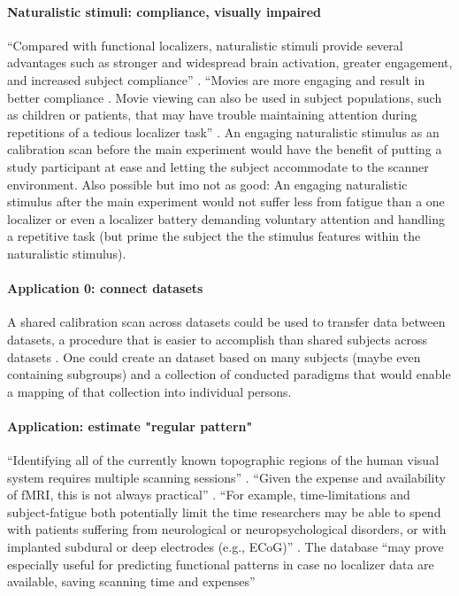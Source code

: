 \paragraph{Naturalistic stimuli: compliance, visually impaired}
%
``Compared with functional localizers, naturalistic stimuli provide several
advantages such as stronger and widespread brain activation, greater engagement,
and increased subject compliance'' \citep{jiahui2020predicting}.
%
``Movies are more engaging and result in better compliance
\citep{vanderwal2015inscapes}.
%
Movie viewing can also be used in subject populations, such as children
\citep{richardson2018development} or patients, that may have trouble maintaining
attention during repetitions of a tedious localizer task''
\citep{jiahui2020predicting}.
%
An engaging naturalistic stimulus as an calibration scan before the main
experiment would have the benefit of putting a study participant at ease and
letting the subject accommodate to the scanner environment.
%
Also possible but imo not as good: An engaging naturalistic stimulus after the
main experiment would not suffer less from fatigue than a one localizer or even
a localizer battery demanding voluntary attention and handling a repetitive task
(but prime the subject the the stimulus features within the naturalistic
stimulus).


\paragraph{Application 0: connect datasets}

%
A shared calibration scan across datasets could be used to transfer data between
datasets, a procedure that is easier to accomplish than shared subjects across
datasets \citep[cf.][an extension of the \ac{srm} for shared subjects across
datasets]{zhang2018transfer}.
%
One could create an dataset based on many subjects (maybe even containing
subgroups) and a collection of conducted paradigms that would enable a mapping
of that collection into individual persons.


\paragraph{Application: estimate "regular pattern"}

``Identifying all of the currently known topographic regions of the human visual
system requires multiple scanning sessions'' \citep{wang2015probabilistic}.
%
``Given the expense and availability of fMRI, this is not always practical''
\citep{wang2015probabilistic}.
%
``For example, time-limitations and subject-fatigue both potentially limit the
time researchers may be able to spend with patients suffering from neurological
or neuropsychological disorders, or with implanted subdural or deep electrodes
(e.g., ECoG)'' \citep{wang2015probabilistic}.
%
The database ``may prove especially useful for predicting functional patterns in
case no localizer data are available, saving scanning time and expenses''
\citep{rosenke2021probabilistic}

